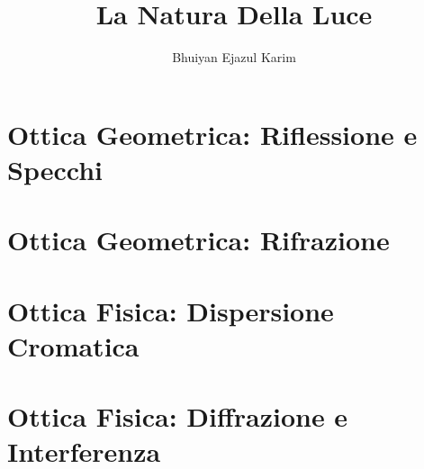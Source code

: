 \documentclass{beamer}
\title{La Natura Della Luce}
\author{Bhuiyan Ejazul Karim}
\begin{document}
\maketitle







\section{Ottica Geometrica: Riflessione e Specchi}


\renewcommand{\currentlink}{file:///C:/Users/ontor/Desktop/fisica/rifrazione.html}
\section{Ottica Geometrica: Rifrazione}


\renewcommand{\currentlink}{file:///C:/Users/ontor/Desktop/fisica/dispersione.html}
\section{Ottica Fisica: Dispersione Cromatica}


\renewcommand{\currentlink}{file:///C:/Users/ontor/Desktop/fisica/interferenza.html}
\section{Ottica Fisica: Diffrazione e Interferenza}



\end{document}
